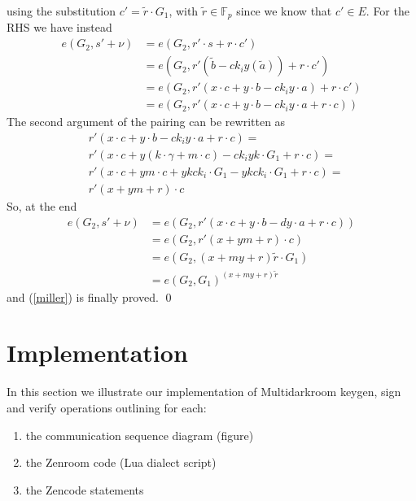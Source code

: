 \documentclass[twocolumn]{article}
\begin{document}
using the substitution $c'=\tilde{r}\cdot G_1$, with $\tilde{r}\in\mathbb{F}_p$ since we know that $c'\in E$. For the RHS we have instead
\begin{align*}
    e(G_2, s' + \nu) &= e(G_2, r'\cdot s + r \cdot c') \\
    &= e(G_2, r'(\tilde{b} - ck_iy (\tilde{a})) + r \cdot c') \\
    &= e(G_2, r'(x\cdot c + y\cdot b - ck_iy\cdot a) + r \cdot c') \\
    &= e(G_2, r'(x\cdot c + y\cdot b - ck_iy\cdot a + r \cdot c)) 
\end{align*}
The second argument of the pairing can be rewritten as
\[
\begin{split}
    &r'(x\cdot c + y\cdot b - ck_iy\cdot a + r \cdot c) = \\
    &r'(x\cdot c + y(k\cdot \gamma + m\cdot c) - ck_iyk\cdot G_1 +     r \cdot c) = \\
    &r'(x\cdot c + ym\cdot c +         ykck_i\cdot G_1  - ykck_i\cdot     G_1 + r \cdot c) = \\
    &r'(x + ym + r) \cdot c
\end{split}
\]
So, at the end
\[
\begin{split}
    e(G_2, s' + \nu) &= e(G_2, r'(x\cdot c + y\cdot b - dy\cdot a + r \cdot c)) \\
    &= e(G_2, r'(x + ym + r) \cdot c) \\
    &= e(G_2,(x+my+r)\tilde{r}\cdot G_1) \\
    &= e(G_2,G_1)^{(x+my+r)\tilde{r}}
\end{split}
\]
and (\ref{miller}) is finally proved. 
\qed

\section{Implementation}
\label{sec:implementation}

\lstset{basicstyle=\ttfamily\scriptsize, breaklines=true}

In this section we illustrate our implementation of Multidarkroom
keygen, sign and verify operations outlining for each:

\begin{enumerate}
  \item the communication sequence diagram (figure)
  \item the Zenroom code (Lua dialect script)
  \item the Zencode statements
\end{enumerate}
\end{document}
